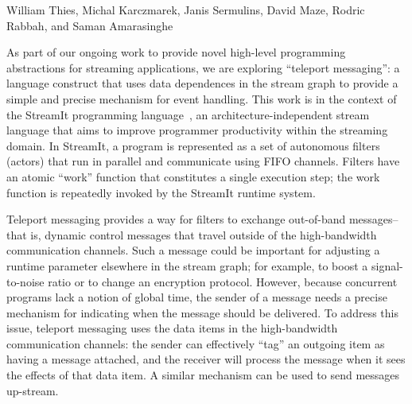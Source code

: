 \documentclass{csailabstractbook}
\begin{document}


         {William Thies, Michal Karczmarek, Janis Sermulins, David Maze, Rodric Rabbah, and Saman Amarasinghe}



As part of our ongoing work to provide novel high-level programming
abstractions for streaming applications, we are exploring ``teleport
messaging'': a language construct that uses data dependences in the
stream graph to provide a simple and precise mechanism for event
handling.  This work is in the context of the StreamIt programming
language~\cite{streamitcc}, an architecture-independent stream
language that aims to improve programmer productivity within the
streaming domain.  In StreamIt, a program is represented as a set of
autonomous filters (actors) that run in parallel and communicate using
FIFO channels.  Filters have an atomic ``work'' function that
constitutes a single execution step; the work function is repeatedly
invoked by the StreamIt runtime system.

Teleport messaging provides a way for filters to exchange out-of-band
messages--that is, dynamic control messages that travel outside of the
high-bandwidth communication channels.  Such a message could be
important for adjusting a runtime parameter elsewhere in the stream
graph; for example, to boost a signal-to-noise ratio or to change an
encryption protocol.  However, because concurrent programs lack a
notion of global time, the sender of a message needs a precise
mechanism for indicating when the message should be delivered.  To
address this issue, teleport messaging uses the data items in the
high-bandwidth communication channels: the sender can effectively
``tag'' an outgoing item as having a message attached, and the
receiver will process the message when it sees the effects of that
data item.  A similar mechanism can be used to send messages
up-stream.
\end{document}
